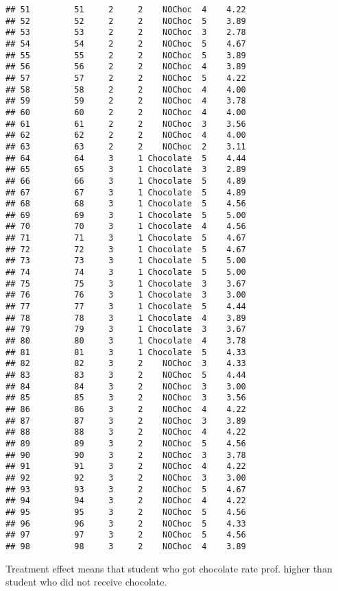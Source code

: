 \documentclass[
]{article}
\begin{document}
\begin{verbatim}
## 51         51     2     2    NOChoc  4    4.22
## 52         52     2     2    NOChoc  5    3.89
## 53         53     2     2    NOChoc  3    2.78
## 54         54     2     2    NOChoc  5    4.67
## 55         55     2     2    NOChoc  5    3.89
## 56         56     2     2    NOChoc  4    3.89
## 57         57     2     2    NOChoc  5    4.22
## 58         58     2     2    NOChoc  4    4.00
## 59         59     2     2    NOChoc  4    3.78
## 60         60     2     2    NOChoc  4    4.00
## 61         61     2     2    NOChoc  3    3.56
## 62         62     2     2    NOChoc  4    4.00
## 63         63     2     2    NOChoc  2    3.11
## 64         64     3     1 Chocolate  5    4.44
## 65         65     3     1 Chocolate  3    2.89
## 66         66     3     1 Chocolate  5    4.89
## 67         67     3     1 Chocolate  5    4.89
## 68         68     3     1 Chocolate  5    4.56
## 69         69     3     1 Chocolate  5    5.00
## 70         70     3     1 Chocolate  4    4.56
## 71         71     3     1 Chocolate  5    4.67
## 72         72     3     1 Chocolate  5    4.67
## 73         73     3     1 Chocolate  5    5.00
## 74         74     3     1 Chocolate  5    5.00
## 75         75     3     1 Chocolate  3    3.67
## 76         76     3     1 Chocolate  3    3.00
## 77         77     3     1 Chocolate  5    4.44
## 78         78     3     1 Chocolate  4    3.89
## 79         79     3     1 Chocolate  3    3.67
## 80         80     3     1 Chocolate  4    3.78
## 81         81     3     1 Chocolate  5    4.33
## 82         82     3     2    NOChoc  3    4.33
## 83         83     3     2    NOChoc  5    4.44
## 84         84     3     2    NOChoc  3    3.00
## 85         85     3     2    NOChoc  3    3.56
## 86         86     3     2    NOChoc  4    4.22
## 87         87     3     2    NOChoc  3    3.89
## 88         88     3     2    NOChoc  4    4.22
## 89         89     3     2    NOChoc  5    4.56
## 90         90     3     2    NOChoc  3    3.78
## 91         91     3     2    NOChoc  4    4.22
## 92         92     3     2    NOChoc  3    3.00
## 93         93     3     2    NOChoc  5    4.67
## 94         94     3     2    NOChoc  4    4.22
## 95         95     3     2    NOChoc  5    4.56
## 96         96     3     2    NOChoc  5    4.33
## 97         97     3     2    NOChoc  5    4.56
## 98         98     3     2    NOChoc  4    3.89
\end{verbatim}

Treatment effect means that student who got chocolate rate prof. higher
than student who did not receive chocolate.
\end{document}
